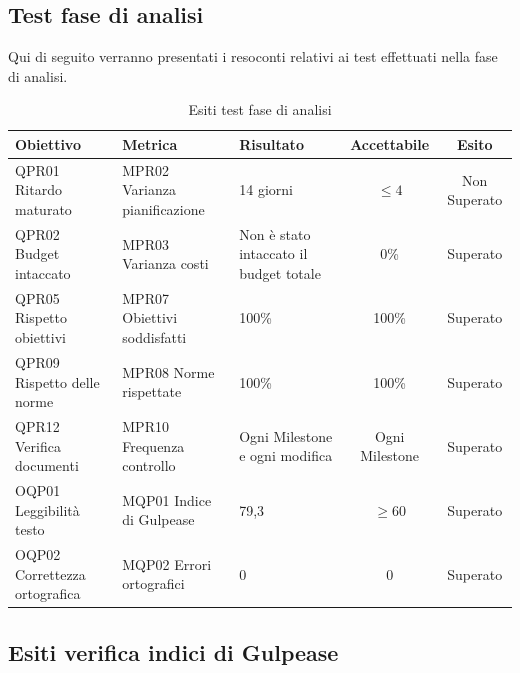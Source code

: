 \documentclass[../piano_di_qualifica.tex]{subfiles}
\begin{document}
\subsection{Test fase di analisi}
Qui di seguito verranno presentati i resoconti relativi ai test effettuati nella fase di analisi. \par

\begin{table}[!ht]
	\centering
	\begin{tabular}{|p{3cm}|p{3.3cm}|l|c|c|}
		\hline
		\rowcolor{lightgray}
		\textbf{Obiettivo}            & \textbf{Metrica}              & \textbf{Risultato}                     & \textbf{Accettabile} & \textbf{Esito} \\
		\hline
		QPR01 Ritardo maturato        & MPR02 Varianza pianificazione & 14 giorni                              & \(\leq 4\)           & Non Superato   \\
		\hline
		QPR02 Budget intaccato        & MPR03 Varianza costi          & Non è stato intaccato il budget totale & 0\%                  & Superato       \\
		\hline
		QPR05 Rispetto obiettivi      & MPR07 Obiettivi soddisfatti   & 100\%                                  & 100\%                & Superato       \\
		\hline
		QPR09 Rispetto delle norme    & MPR08 Norme rispettate        & 100\%                                  & 100\%                & Superato       \\
		\hline
		QPR12 Verifica documenti      & MPR10 Frequenza controllo     & Ogni Milestone e ogni modifica         & Ogni Milestone       & Superato       \\
		\hline
		OQP01 Leggibilità testo       & MQP01 Indice di Gulpease      & 79,3                                   & \(\ge 60\)           & Superato       \\
		\hline
		OQP02 Correttezza ortografica & MQP02 Errori ortografici      & 0                                      & 0                    & Superato       \\
		\hline
	\end{tabular}
	\caption{Esiti test fase di analisi}
\end{table}


\subsection{Esiti verifica indici di Gulpease}
\label{sub:verif_gul}
\end{document}
